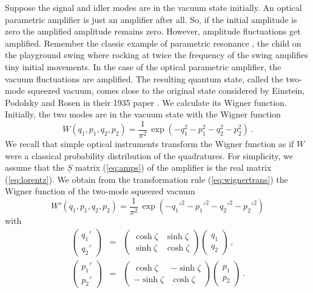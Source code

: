 \documentclass[12pt,amsmath,amssymb]{article}
\numberwithin{equation}{section}
\begin{document}
Suppose the signal and idler modes are in the vacuum state
initially. An optical parametric amplifier is just an
amplifier after all. So, if the initial amplitude is zero the
amplified amplitude remains zero. However, amplitude
fluctuations get amplified. Remember the classic example of
parametric resonance \cite{LL1}, the
child on the playground swing where rocking at twice
the frequency of the swing amplifies tiny initial movements.
In the case of the optical parametric amplifier,
the vacuum fluctuations are amplified.
The resulting quantum state, called the two-mode squeezed vacuum,
comes close to the original state considered by Einstein, Podolsky
and Rosen in their 1935 paper \cite{EPR}.
We calculate its Wigner function.
Initially, the two modes are in the vacuum state with the
Wigner function \cite{Leonhardt}
\begin{equation}
W(q_1,p_1,q_2,p_2) = \frac{1}{\pi^2}\,
\exp\left(-q_1^2-p_1^2-q_2^2-p_2^2\right) \,.
\end{equation}
We recall that simple optical instruments transform the Wigner function
as if $W$ were a classical probability distribution of the quadratures.
For simplicity, we assume that the $\underline{S}$ matrix
(\ref{eq:amps}) of the amplifier is the real matrix (\ref{eq:lorentz}).
We obtain from the transformation rule (\ref{eq:wignertrans})
the Wigner function of the two-mode squeezed vacuum
\begin{equation}
W'(q_1,p_1,q_2,p_2) =
\frac{1}{\pi^2}\, \exp\left(-q_1'^2-p_1'^2-q_2'^2-p_2'^2\right)
\end{equation}
with
\begin{eqnarray}
\left(
    \begin{array}{c}
     q_1'  \\
     q_2'
    \end{array}
\right)& =&
\left(
    \begin{array}{cc}
      \cosh\zeta & \sinh\zeta \\
      \sinh\zeta & \cosh\zeta
    \end{array}
\right)
\left(
    \begin{array}{c}
     q_1  \\
     q_2
    \end{array}
\right)\,,
\nonumber\\
\left(
    \begin{array}{c}
     p_1'  \\
     p_2'
    \end{array}
\right) &=&
\left(
    \begin{array}{cc}
      \cosh\zeta & -\sinh\zeta \\
      -\sinh\zeta & \cosh\zeta
    \end{array}
\right)
\left(
    \begin{array}{c}
     p_1  \\
     p_2
    \end{array}
\right)\,.
\end{eqnarray}
\end{document}
